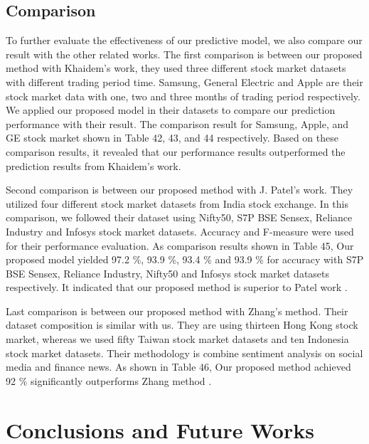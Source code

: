 \documentclass[10pt,twocolumn]{article}
\begin{document}
\subsection{Comparison}
To further evaluate the effectiveness of our predictive model, we also compare our result with the other related works. The first comparison is between our proposed method with Khaidem's work\cite{khaidem2016predicting}, they used three different stock market datasets with different trading period time. Samsung, General Electric and Apple are their stock market data with one, two and three months of trading period respectively. We applied our proposed model in their datasets to compare our prediction performance with their result. The comparison result for Samsung, Apple, and GE stock market shown in Table 42, 43, and 44 respectively. Based on these comparison results, it revealed that our performance results outperformed the prediction results from Khaidem's work\cite{khaidem2016predicting}.
\par 
Second comparison is between our proposed method with J. Patel's work\cite{patel2015predicting}. They utilized four different stock market datasets from India stock exchange. In this comparison, we followed their dataset using Nifty50, S7P BSE Sensex, Reliance Industry and Infosys stock market datasets. Accuracy and F-measure were used for their performance evaluation. As comparison results shown in Table 45, Our proposed model yielded 97.2 \%, 93.9 \%, 93.4 \% and 93.9 \% for accuracy with S7P BSE Sensex, Reliance Industry, Nifty50 and Infosys stock market datasets respectively. It indicated that our proposed method is superior to Patel work \cite{patel2015predicting}.
\par 
Last comparison is between our proposed method with Zhang's method\cite{zhang2018improving}. Their dataset composition is similar with us. They are using thirteen Hong Kong stock market, whereas we used fifty Taiwan stock market datasets and ten Indonesia stock market datasets. Their methodology is combine sentiment analysis on social media and finance news. As shown in Table 46, Our proposed method achieved 92 \% significantly outperforms Zhang method \cite{zhang2018improving}.
\section{Conclusions and Future Works}
\end{document}
